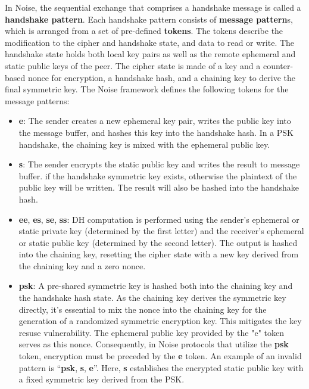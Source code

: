   In Noise, the sequential exchange that comprises a handshake message is called a \textbf{handshake pattern}.
  Each handshake pattern consists of \textbf{message pattern}s, which is arranged from a set of 
  pre-defined \textbf{tokens}. The tokens describe the modification to the cipher and handshake state, and
  data to read or write. The handshake state holds both local key pairs as well as the remote ephemeral 
  and static public keys of the peer. The cipher state is made of a key and a counter-based nonce for 
  encryption, a handshake hash, and a chaining key to derive the final symmetric key. The Noise framework 
  defines the following tokens for the message patterns:
  \begin{itemize}
    \item \textbf{e}: The sender creates a new ephemeral key pair, writes the public key into the 
    message buffer, and hashes this key into the handshake hash. In a PSK handshake, the chaining
    key is mixed with the ephemeral public key.
    \item \textbf{s}: The sender encrypts the static public key and writes the result to message buffer. 
    if the handshake symmetric key exists, otherwise the plaintext of the public key will be written.
    The result will also be hashed into the handshake hash.
    \item \textbf{ee}, \textbf{es}, \textbf{se}, \textbf{ss}: DH computation is performed using
    the sender's ephemeral or static private key (determined by the first letter) and the receiver's
    ephemeral or static public key (determined by the second letter). The output is hashed into
    the chaining key, resetting the cipher state with a new key derived from the chaining key and 
    a zero nonce.
    \item \textbf{psk}: A pre-shared symmetric key is hashed both into the chaining key and the
    handshake hash state. As the chaining key derives the symmetric key directly, it's essential
    to mix the nonce into the chaining key for the generation of a randomized symmetric encryption
    key. This mitigates the key resuse vulnerability. The ephemeral public key provided by the "e" 
    token serves as this nonce. Consequently, in Noise protocols that utilize the \textbf{psk} token, 
    encryption must be preceded by the \textbf{e} token. An example of an invalid pattern is 
    ``\textbf{psk}, \textbf{s}, \textbf{e}''. Here, \textbf{s} establishes the encrypted static
    public key with a fixed symmetric key derived from the PSK.
  \end{itemize}


